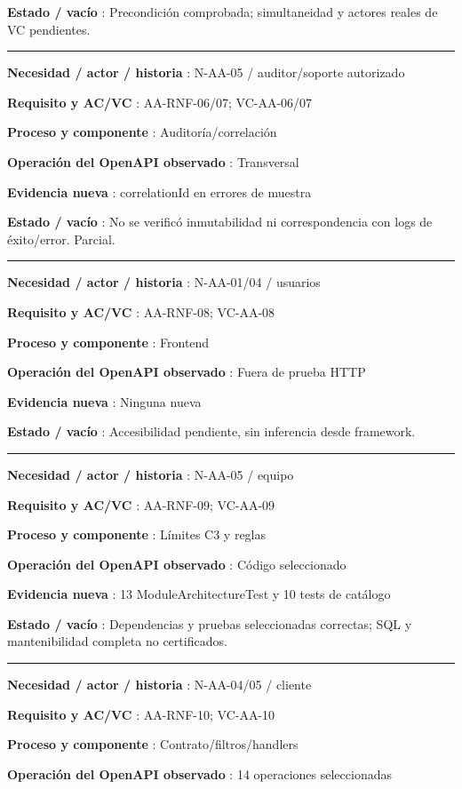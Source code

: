 \documentclass[11pt,a4paper]{article}
\begin{document}
\textbf{Estado / vacío }: Precondición comprobada; simultaneidad y
actores reales de VC pendientes.

\medskip\hrule\medskip

\textbf{Necesidad / actor / historia }: N-AA-05 / auditor/soporte
autorizado

\textbf{Requisito y AC/VC }: AA-RNF-06/07; VC-AA-06/07

\textbf{Proceso y componente }: Auditoría/correlación

\textbf{Operación del OpenAPI observado }: Transversal

\textbf{Evidencia nueva }: correlationId en errores de muestra

\textbf{Estado / vacío }: No se verificó inmutabilidad ni
correspondencia con logs de éxito/error. Parcial.

\medskip\hrule\medskip

\textbf{Necesidad / actor / historia }: N-AA-01/04 / usuarios

\textbf{Requisito y AC/VC }: AA-RNF-08; VC-AA-08

\textbf{Proceso y componente }: Frontend

\textbf{Operación del OpenAPI observado }: Fuera de prueba HTTP

\textbf{Evidencia nueva }: Ninguna nueva

\textbf{Estado / vacío }: Accesibilidad pendiente, sin inferencia desde
framework.

\medskip\hrule\medskip

\textbf{Necesidad / actor / historia }: N-AA-05 / equipo

\textbf{Requisito y AC/VC }: AA-RNF-09; VC-AA-09

\textbf{Proceso y componente }: Límites C3 y reglas

\textbf{Operación del OpenAPI observado }: Código seleccionado

\textbf{Evidencia nueva }: 13 ModuleArchitectureTest y 10 tests de
catálogo

\textbf{Estado / vacío }: Dependencias y pruebas seleccionadas
correctas; SQL y mantenibilidad completa no certificados.

\medskip\hrule\medskip

\textbf{Necesidad / actor / historia }: N-AA-04/05 / cliente

\textbf{Requisito y AC/VC }: AA-RNF-10; VC-AA-10

\textbf{Proceso y componente }: Contrato/filtros/handlers

\textbf{Operación del OpenAPI observado }: 14 operaciones seleccionadas
\end{document}
